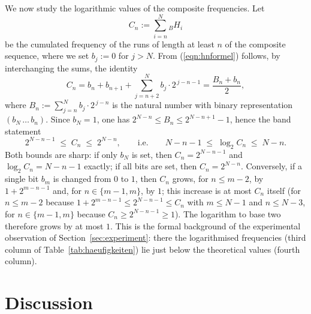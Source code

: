 \documentclass[11pt,a4paper]{scrartcl}
\theoremstyle{plain}
\theoremstyle{definition}
\theoremstyle{remark}
\begin{document}
\noindent We now study the logarithmic values of the composite
frequencies. Let
\begin{equation}
  C_n:=\sum_{i=n}^{N} {_B}H_i
\end{equation}
be the cumulated frequency of the runs of length at least $n$ of the
composite sequence, where we set $b_j:=0$ for $j>N$. From
(\ref{eqn:hnformel}) follows, by interchanging the sums, the identity
\begin{equation}\label{eqn:kumulatividentitaet}
  C_n
  = b_n + b_{n+1} + \sum_{j=n+2}^{N} b_j\cdot 2^{\,j-n-1}
  = \frac{B_n+b_n}{2},
\end{equation}
where $B_n:=\sum_{j=n}^{N} b_j\cdot 2^{\,j-n}$ is the natural number
with binary representation $(b_N\,\dots\,b_n)$. Since $b_N=1$, one
has $2^{N-n}\leq B_n\leq 2^{N-n+1}-1$, hence the band statement
\begin{equation}\label{eqn:logband}
  2^{N-n-1}\;\leq\; C_n \;\leq\; 2^{N-n},
  \qquad\text{i.e.}\qquad
  N-n-1\;\leq\;\log_2 C_n\;\leq\;N-n.
\end{equation}
Both bounds are sharp: if only $b_N$ is set, then
$C_n=2^{N-n-1}$ and $\log_2 C_n=N-n-1$ exactly; if all bits are set,
then $C_n=2^{N-n}$. Conversely, if a single bit $b_m$ is changed from
$0$ to $1$, then $C_n$ grows, for $n\leq m-2$, by $1+2^{m-n-1}$ and,
for $n\in\{m-1,m\}$, by $1$; this increase is at most $C_n$ itself
(for $n\leq m-2$ because
$1+2^{m-n-1}\leq 2^{N-n-1}\leq C_n$ with $m\leq N-1$ and $n\leq N-3$,
for $n\in\{m-1,m\}$ because $C_n\geq 2^{N-n-1}\geq 1$). The
logarithm to base two therefore grows by at most $1$. This is the
formal background of the experimental observation of
Section~\ref{sec:experiment}: there the logarithmised frequencies
(third column of Table~\ref{tab:haeufigkeiten}) lie just below the
theoretical values (fourth column).

\section{Discussion}\label{sec:diskussion}
\end{document}
